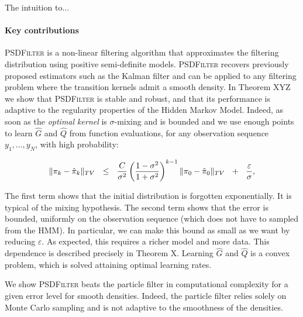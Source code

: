 The intuition to...

\paragraph{Key contributions}
\textsc{PSDFilter} is a non-linear filtering algorithm that approximates the filtering distribution using positive semi-definite models. \textsc{PSDFilter} recovers previously proposed estimators such as the Kalman filter and can be applied to any filtering problem where the transition kernels admit a smooth density. In Theorem XYZ we show that \textsc{PSDFilter} is stable and robust, and that its performance is adaptive to the regularity properties of the Hidden Markov Model. Indeed, as soon as the \emph{optimal kernel} is $\sigma$-mixing and is bounded and we use enough points to learn $\hat G$ and $\hat Q$ from function evaluations, for any observation sequence $y_1, \ldots, y_N$, with high probability:

\begin{align}
    \Vert \pi_k - \hat\pi_k\Vert_{TV} ~~\leq~~ \frac{C}{\sigma^2}\left(\frac{1-\sigma^2}{1 + \sigma^2}\right)^{k-1}\|\pi_0 - \hat{\pi}_0\|_{TV} ~~+~~ \frac{\varepsilon}{\sigma},
\end{align}

The first term shows that the initial distribution is forgotten exponentially. It is typical of the mixing hypothesis. The second term shows that the error is bounded, uniformly on the observation sequence (which does not have to sampled from the HMM). In particular, we can make this bound as small as we want by reducing $\varepsilon$. As expected, this requires a richer model and more data. This dependence is described precisely in Theorem X. Learning $\hat G$ and $\hat Q$ is a convex problem, which is solved attaining optimal learning rates.

We show \textsc{PSDFilter} beats the particle filter in computational complexity for a given error level for smooth densities. Indeed, the particle filter relies solely on Monte Carlo sampling and is not adaptive to the smoothness of the densities.
